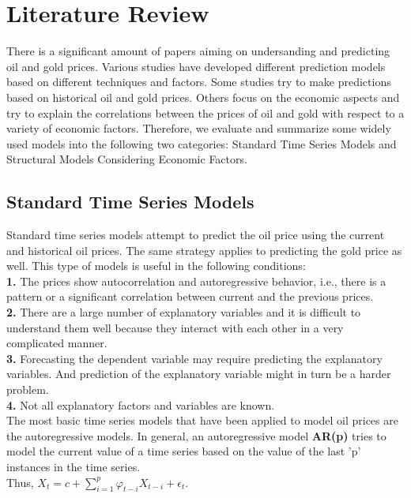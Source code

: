 \documentclass[runningheads]{llncs}
\begin{document}
\section{Literature Review}
There is a significant amount of papers aiming on undersanding and predicting oil and gold prices. Various studies have developed different prediction models based on different techniques and factors. Some studies try to make predictions based on historical oil and gold prices. Others focus on the economic aspects and try to explain the correlations between the prices of oil and gold with respect to a variety of economic factors. Therefore, we evaluate and summarize some widely used models into the following two categories: Standard Time Series Models and Structural Models Considering Economic Factors.

\subsection{Standard Time Series Models}
Standard time series models attempt to predict the oil price using the current and historical oil prices. The same strategy applies to predicting the gold price as well. This type of models is useful in the following conditions:\\
\textbf{1.} The prices show autocorrelation and autoregressive behavior, i.e., there is a pattern or a significant correlation between current and the previous prices.\\
\textbf{2.} There are a large number of explanatory variables and it is difficult to understand them well because they interact with each other in a very complicated manner.\\
\textbf{3.} Forecasting the dependent variable may require predicting the explanatory variables. And prediction of the explanatory variable might in turn be a harder problem.\\
\textbf{4.} Not all explanatory factors and variables are known.\\ 

\noindent The most basic time series models that have been applied to model oil prices are the autoregressive models. In general, an autoregressive model \textbf{AR(p)} tries to model the current value of a time series based on the value of the last 'p' instances in the time series.\\

\noindent Thus, $ X_{t} = c + \sum\limits_{i=1}^p \varphi_{t-i}X_{t-i} + \epsilon_{t}$.\\\\
\end{document}

